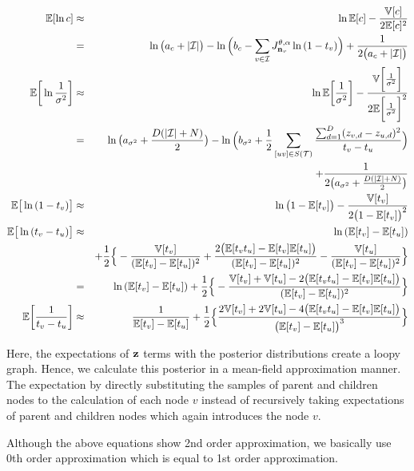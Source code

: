 \documentclass{article}
\begin{document}
	\begin{eqnarray}
		\mathbb{E}[\ln{c}] &\approx & \ln{\mathbb{E}[c]} - \frac{\mathbb{V}[c]}{2\mathbb{E}[c]^2} \nonumber \\
		&=& \ln{ \big( a_c + |\mathcal{I}| \big)} - \ln{ \Big( b_c - \sum_{v \in \mathcal{I}}J^{\theta, \alpha}_{\bold{n}_v}\ln{(1 - t_v})\Big)} + \frac{1}{2 \big( a_c + |\mathcal{I}| \big)} \\
		\mathbb{E} \bigg[ \ln{\frac{1}{\sigma^2}} \bigg] &\approx & \ln{\mathbb{E} \bigg[ \frac{1}{\sigma^2} \bigg]} - \frac{\mathbb{V}\bigg[ \frac{1}{\sigma^2} \bigg]}{2\mathbb{E}\bigg[ \frac{1}{\sigma^2} \bigg]^2} \nonumber \\
		&=& \ln{ \big( a_{\sigma^2} + \frac{D(|\mathcal{I}| + N)}{2} \big) } - \ln{ \Big( b_{\sigma^2} + \frac{1}{2}\sum_{[uv] \in S(\mathcal{T})}\frac{\sum^D_{d=1}(z_{v,d} - z_{u,d})^2}{t_v - t_u}\Big)} \nonumber \\
		& & + \frac{1}{2 \big( a_{\sigma^2} + \frac{D(|\mathcal{I}| + N)}{2} \big)}	 \nonumber \\
		\mathbb{E} \big[ \ln{(1 - t_v)} \big] &\approx & \ln{ \big( 1 - \mathbb{E}[t_v] \big)} - \frac{\mathbb{V}[t_v]}{2 \big( 1 - \mathbb{E}[t_v] \big)^2} \\
		\mathbb{E} \big[ \ln{(t_v - t_u)} \big] &\approx & \ln{(\mathbb{E}[t_v] - \mathbb{E}[t_u])} \nonumber \\
		& & + \frac{1}{2} \Big\{ -\frac{\mathbb{V}[t_v]}{(\mathbb{E}[t_v] - \mathbb{E}[t_u])^2} + \frac{2\big( \mathbb{E}[t_v t_u] - \mathbb{E}[t_v] \mathbb{E}[t_u] \big)}{(\mathbb{E}[t_v] - \mathbb{E}[t_u])^2} - \frac{\mathbb{V}[t_u]}{(\mathbb{E}[t_v] - \mathbb{E}[t_u])^2} \Big\} \nonumber \\
		&=& \ln{(\mathbb{E}[t_v] - \mathbb{E}[t_u])} + \frac{1}{2} \Big\{ -\frac{\mathbb{V}[t_v] + \mathbb{V}[t_u] - 2\big( \mathbb{E}[t_v t_u] - \mathbb{E}[t_v] \mathbb{E}[t_u] \big)}{(\mathbb{E}[t_v] - \mathbb{E}[t_u])^2} \Big\} \\
		\mathbb{E} \bigg[\frac{1}{t_v - t_u} \bigg] &\approx & \frac{1}{\mathbb{E}[t_v] - \mathbb{E}[t_u]} + \frac{1}{2} \Big\{ \frac{2\mathbb{V}[t_v] + 2\mathbb{V}[t_u] - 4\big( \mathbb{E}[t_v t_u] - \mathbb{E}[t_v] \mathbb{E}[t_u] \big)}{ \big( \mathbb{E}[t_v] - \mathbb{E}[t_u] \big)^3} \Big\}
	\end{eqnarray}

Here, the expectations of $\bold{z}$ terms with the posterior distributions create a loopy graph. Hence, we calculate this posterior in a mean-field approximation manner. The expectation by directly substituting the samples of parent and children nodes to the calculation of each node $v$ instead of recursively taking expectations of parent and children nodes which again introduces the node $v$.
	
	Although the above equations show 2nd order approximation, we basically use 0th order approximation which is equal to 1st order approximation.
	
\end{document}
